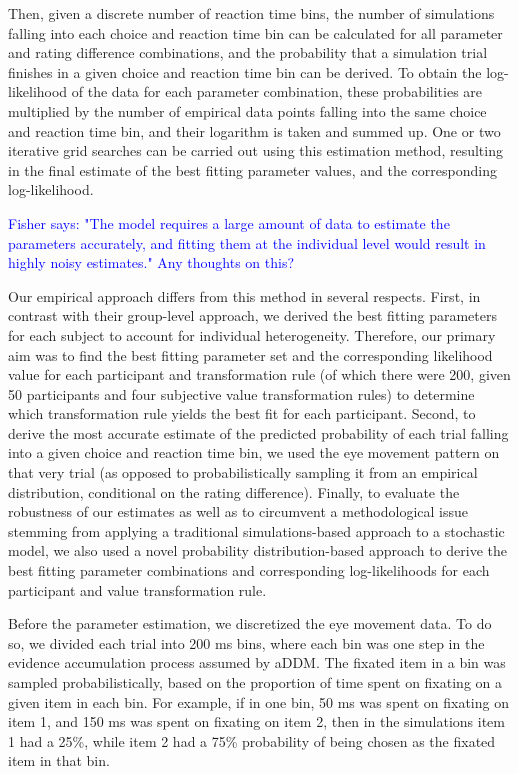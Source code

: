 \documentclass[11pt,a4paper]{article}
\newcommand{\AT}[1] {{\textcolor{blue}{#1}}}
\begin{document}
Then, given a discrete number of reaction time bins, the number of simulations falling into each choice and reaction time bin can be calculated for all parameter and rating difference combinations, and the probability that a simulation trial finishes in a given choice and reaction time bin can be derived. To obtain the log-likelihood of the data for each parameter combination, these probabilities are multiplied by the number of empirical data points falling into the same choice and reaction time bin, and their logarithm is taken and summed up. One or two iterative grid searches can be carried out using this estimation method, resulting in the final estimate of the best fitting parameter values, and the corresponding log-likelihood.


\AT{Fisher says: "The model requires a large amount of data to estimate the parameters accurately, and fitting them at the individual level would result in highly noisy estimates." Any thoughts on this?}

Our empirical approach differs from this method in several respects. First, in contrast with their group-level approach, we derived the best fitting parameters for each subject to account for individual heterogeneity. Therefore, our primary aim was to find the best fitting parameter set and the corresponding likelihood value for each participant and transformation rule (of which there were 200, given 50 participants and four subjective value transformation rules) to determine which transformation rule yields the best fit for each participant. Second, to derive the most accurate estimate of the predicted probability of each trial falling into a given choice and reaction time bin, we used the eye movement pattern on that very trial (as opposed to probabilistically sampling it from an empirical distribution, conditional on the rating difference). Finally, to evaluate the robustness of our estimates as well as to circumvent a methodological issue stemming from applying a traditional simulations-based approach to a stochastic model, we also used a novel probability distribution-based approach to derive the best fitting parameter combinations and corresponding log-likelihoods for each participant and value transformation rule.

Before the parameter estimation, we discretized the eye movement data. To do so, we divided each trial into 200 ms bins, where each bin was one step in the evidence accumulation process assumed by aDDM. The fixated item in a bin was sampled probabilistically, based on the proportion of time spent on fixating on a given item in each bin. For example, if in one bin, 50 ms was spent on fixating on item 1, and 150 ms was spent on fixating on item 2, then in the simulations item 1 had a 25\%, while item 2 had a 75\% probability of being chosen as the fixated item in that bin. 
\end{document}
